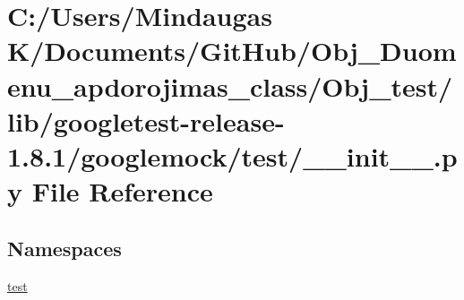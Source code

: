 \hypertarget{_obj__test_2lib_2googletest-release-1_88_81_2googlemock_2test_2____init_____8py}{}\section{C\+:/\+Users/\+Mindaugas K/\+Documents/\+Git\+Hub/\+Obj\+\_\+\+Duomenu\+\_\+apdorojimas\+\_\+class/\+Obj\+\_\+test/lib/googletest-\/release-\/1.8.1/googlemock/test/\+\_\+\+\_\+init\+\_\+\+\_\+.py File Reference}
\label{_obj__test_2lib_2googletest-release-1_88_81_2googlemock_2test_2____init_____8py}
\subsection*{Namespaces}
\begin{DoxyCompactItemize}
\item 
 \mbox{\hyperlink{namespacetest}{test}}
\end{DoxyCompactItemize}
